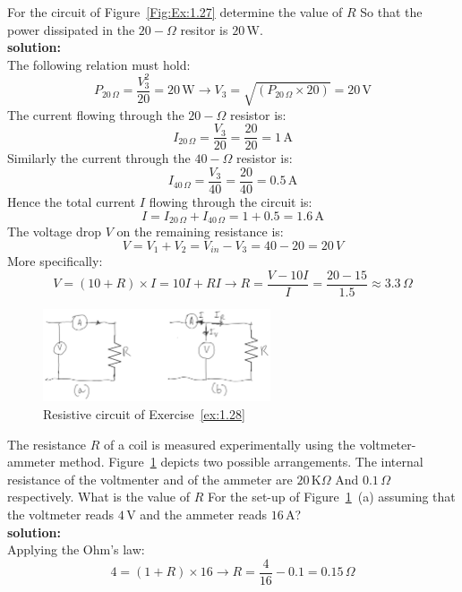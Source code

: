 \begin{exercise}
\label{ex:1.27}
For the circuit of Figure~\ref{Fig:Ex:1.27} determine the value of $R$ So that the power dissipated in the $20-\Omega$ resitor is $20\,\textrm{W}$.\\

\textbf{solution:}\\ 
The following relation must hold:
\[P_{20\,\Omega} = \frac{V_3^2}{20} = 20\,\textrm{W} \longrightarrow V_3 = \sqrt{(P_{20\,\Omega} \times 20)} = 20\,\textrm{V}\]
The current flowing through the $20-\Omega$ resistor is:
\[I_{20\,\Omega} = \frac{V_3}{20} = \frac{20}{20} = 1\,\textrm{A}\]
Similarly the current through the $40-\Omega$ resistor is:
\[I_{40\,\Omega} = \frac{V_3}{40} = \frac{20}{40} = 0.5\,\textrm{A}\]
Hence the total current $I$ flowing through the circuit is:
\[I = I_{20\,\Omega} + I_{40\,\Omega} = 1 + 0.5 = 1.6\,\textrm{A}\]
The voltage drop $V$ on the remaining resistance is:
\[V = V_1 + V_2 = V_{in} - V_3 = 40 - 20 = 20\,V\]
More specifically:
\[V= (10 + R) \times I  = 10I + RI \longrightarrow R = \frac{V - 10I}{I} = \frac{20 - 15}{1.5} \approx 3.3\,\Omega\]
\end{exercise}

\begin{figure}[h!]
  \centering
  \includegraphics[width=0.6\textwidth]{"images/Fig-07"}
  \caption{Resistive circuit of Exercise~\ref{ex:1.28}} 
  \label{Fig:Ex:1.28}
\end{figure}

\begin{exercise}
\label{ex:1.28}
The resistance $R$ of a coil is measured experimentally using the voltmeter-ammeter method. Figure~\ref{Fig:Ex:1.28} depicts two possible arrangements. The internal resistance of the voltmenter and of the ammeter are $20\,\textrm{K}\Omega$ And $0.1\,\Omega$ respectively. What is the value of $R$ For the set-up of Figure~\ref{Fig:Ex:1.28}~(a) assuming that the voltmeter reads $4\,\textrm{V}$ and the ammeter reads $16\,\textrm{A}$?\\

\textbf{solution:}\\ 
Applying the Ohm's law:
\[4 = (1 + R)\times 16 \longrightarrow R = \frac{4}{16} - 0.1 =0.15\,\Omega\]
\end{exercise}

